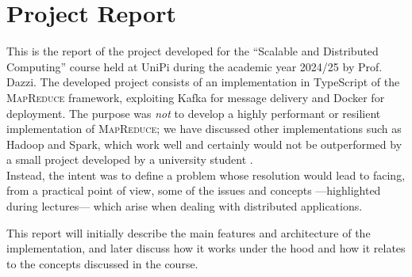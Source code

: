 \chapter{Project Report}

This is the report of the project developed for the ``Scalable and Distributed Computing'' course held at UniPi during the academic year 2024/25 by Prof. Dazzi.
The developed project consists of an implementation in TypeScript of the \textsc{MapReduce} framework, exploiting Kafka for message delivery and Docker for deployment.
The purpose was \textit{not} to develop a highly performant or resilient implementation of \textsc{MapReduce}; we have discussed other implementations such as Hadoop and Spark, which work well and certainly would not be outperformed by a small project developed by a university student \smiley. \\
Instead, the intent was to define a problem whose resolution would lead to facing, from a practical point of view, some of the issues and concepts ---highlighted during lectures--- which arise when dealing with distributed applications.

\nl
\nl

This report will initially describe the main features and architecture of the implementation, and later discuss how it works under the hood and how it relates to the concepts discussed in the course.

\nl
\nl

